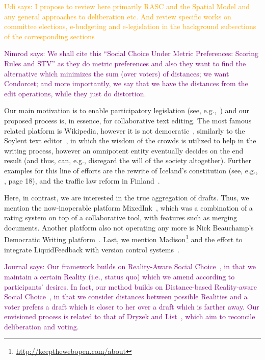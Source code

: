 \documentclass{llncs}
\newcommand{\journal}[1]{\textcolor{purple}{Journal says: #1}}
\newcommand{\nimrod}[1]{\textcolor{purple}{Nimrod says: #1}}
\newcommand{\udi}[1]{\textcolor{orange}{Udi says: #1}}
\begin{document}
\udi{I propose to review here primarily RASC and the Spatial Model and any general approaches to deliberation etc.
%
 And review specific works on committee elections, e-budgeting and e-legislation in the background subsections of the corresponding sections}

\nimrod{We shall cite this ``Social Choice Under Metric Preferences: Scoring Rules and STV'' as they do metric preferences and also they want to find the alternative which minimizes the sum (over voters) of distances; we want Condorcet; and more importantly, we say that we have the distances from the edit operations, while they just do distortion.}

Our main motivation is to enable participatory legislation (see, e.g.,~\cite{ochoa2008relationship}) and our proposed process is, in essence, for collaborative text editing.
The most famous related platform is Wikipedia, however it is not democratic~\cite{black2008wikipedia},
similarly to the Soylent text editor~\cite{soylent},
in which the wisdom of the crowds is utilized to help in the writing process,
however an omnipotent entity eventually decides on the end result (and thus, can, e.g., disregard the will of the society altogether).
%
Further examples for this line of efforts are the rewrite of Iceland's constitution (see, e.g., \cite{aitamurto2012crowdsourcing}, page 18),
and the traffic law reform in Finland~\cite{govlabone}.

Here, in contrast, we are interested in the true aggregation of drafts.
Thus, we mention the now-inoperable platform MixedInk~\cite{slateone}, which was a combination of a rating system on top of a collaborative tool, with features such as merging documents.
Another platform also not operating any more is Nick Beauchamp's Democratic Writing platform~\cite{nickone}.
Last, we mention Madison\footnote{\url{http://keepthewebopen.com/about}}
and the effort to integrate LiquidFeedback with version control systems~\cite{liquidone}.

\journal{%
Our framework builds on Reality-Aware Social Choice~\cite{realsoc},
in that we maintain a certain Reality (i.e., status quo) which we amend according to participants' desires.
In fact, our method builds on Distance-based Reality-aware Social Choice~\cite{realsoc},
in that we consider distances between possible Realities and a voter prefers a draft which is closer to her over a draft which is farther away.
Our envisioned process is related to that of Dryzek and List~\cite{dryzek2003social}, which aim to reconcile deliberation and voting.
}
\end{document}
